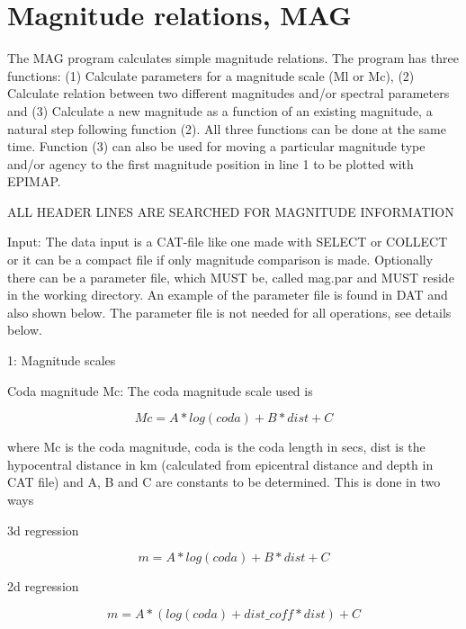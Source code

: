
\section{Magnitude relations, MAG} 

The MAG program calculates simple magnitude relations. The program has three functions: (1) Calculate parameters for a magnitude scale (Ml or Mc), (2) Calculate relation between two different magnitudes and/or spectral parameters and (3) Calculate a new magnitude as a function of an existing magnitude, a natural step following function (2). All three functions can be done at the same time. Function (3) can also be used for moving a particular magnitude type and/or agency to the first magnitude position in line 1 to be plotted with EPIMAP.  

ALL HEADER LINES ARE SEARCHED FOR MAGNITUDE INFORMATION 

Input: The data input is a CAT-file like one made with SELECT or COLLECT or it can be a compact file if only magnitude comparison is made. Optionally there can be a parameter file, which MUST be, called mag.par and MUST reside in the working directory. An example of the parameter file is found in DAT and also shown below. The parameter file is not needed for all operations, see details below. 

1: Magnitude scales 

Coda magnitude Mc: The coda magnitude scale used is 

\begin{displaymath}
Mc = A * log(coda) + B * dist + C 
\end{displaymath}

where Mc is the coda magnitude, coda is the coda length in secs, dist is the hypocentral distance in km (calculated from epicentral distance and depth in CAT file) and A, B and C are constants to be determined. This is done in two ways 

3d regression 

\begin{displaymath}
m = A * log (coda) + B * dist + C 
\end{displaymath}

2d regression 

\begin{displaymath}
m = A * (log (coda) + dist\_coff * dist) + C 
\end{displaymath}

